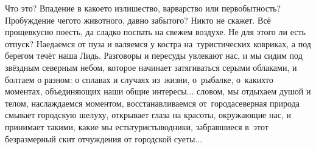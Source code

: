 Что это? Впадение в какое\sdash то излишество, варварство или первобытность? Пробуждение чего\sdash то животного, давно забытого? Никто не скажет. Всё проще\mdash вкусно поесть, да сладко поспать на свежем воздухе. Не для этого ли есть отпуск? Наедаемся от пуза и валяемся у костра на~туристических ковриках, а под берегом течёт наша Лидь. Разговоры и пересуды увлекают нас, и мы сидим под звёздным северным небом, которое начинает затягиваться серыми облаками, и болтаем о разном: о сплавах и случаях из~жизни, о~рыбалке, о~каких\sdash то моментах, объединяющих наши общие интересы$\ldots$ словом, мы отдыхаем душой и телом, наслаждаемся моментом, восстанавливаемся от~города\mdash северная природа смывает городскую шелуху, открывает глаза на красоты, окружающие нас, и принимает такими, какие мы есть\mdash туристы\sdash водники, забравшиеся в~этот безразмерный скит отчуждения от городской суеты$\ldots$ 

\begin{center}
\end{center}
